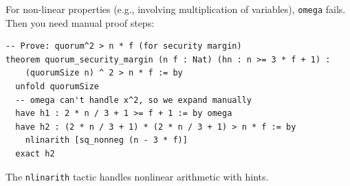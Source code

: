 For non-linear properties (e.g., involving multiplication of variables), \texttt{omega}
fails. Then you need manual proof steps:

\begin{lstlisting}[language=Lean,caption={Non-linear threshold proof}]
-- Prove: quorum^2 > n * f (for security margin)
theorem quorum_security_margin (n f : Nat) (hn : n >= 3 * f + 1) :
    (quorumSize n) ^ 2 > n * f := by
  unfold quorumSize
  -- omega can't handle x^2, so we expand manually
  have h1 : 2 * n / 3 + 1 >= f + 1 := by omega
  have h2 : (2 * n / 3 + 1) * (2 * n / 3 + 1) > n * f := by
    nlinarith [sq_nonneg (n - 3 * f)]
  exact h2
\end{lstlisting}

The \texttt{nlinarith} tactic handles nonlinear arithmetic with hints.

